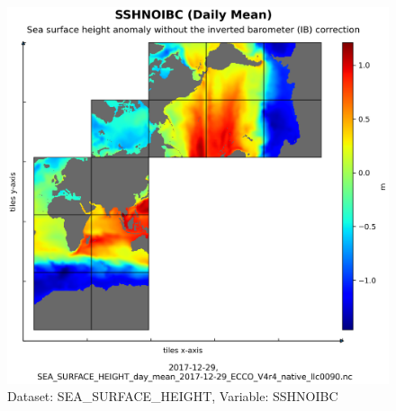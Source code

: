 \begin{figure}[H]
\centering
\includegraphics[scale=0.55]{../images/plots/native_plots/Sea_Surface_Height/SSHNOIBC.png}
\caption{Dataset: SEA\_SURFACE\_HEIGHT, Variable: SSHNOIBC}
\label{tab:table-SEA_SURFACE_HEIGHT_SSHNOIBC-Plot}
\end{figure}